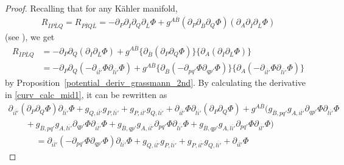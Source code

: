 \documentclass[pdftex]{sigma}
\numberwithin{equation}{section}
\begin{document}
\begin{proof}
Recalling that for any K\"ahler manifold,
\begin{align*}
 R_{\overline{I}P\overline{L}Q}
 =
 R_{P\overline{I}Q\overline{L}}
 =
 -\partial_{P}\partial_{\overline{I}}\partial_{Q}\partial_{\overline{L}}\Phi
 +
 g^{A\overline{B}}
 (
 \partial_{P}\partial_{\overline{B}}\partial_{Q}\Phi
 )
 (
 \partial_{A}\partial_{\overline{I}}\partial_{\overline{L}}\Phi
 )
\end{align*}
(see \cite[Appendix A]{OS_jrnl}),
we get
\begin{align}
 R_{\overline{I}P\overline{L}Q}
& =
 -
 \partial_{P}\partial_{Q}
 (
 \partial_{\overline{I}}\partial_{\overline{L}}\Phi
 )
 +
 g^{A\overline{B}}
 \{
 \partial_{\overline{B}}
 (
 \partial_{P}\partial_{Q}\Phi
 )
 \}
 \{
 \partial_{A}
 (
 \partial_{\overline{I}}\partial_{\overline{L}}\Phi
 )
 \}
 \nonumber
 \\
 &=
 -
 \partial_{P}\partial_{Q}
 (
 -
 \partial_{\overline{il'}}\Phi
 \partial_{\overline{li'}}\Phi
 )
 +
 g^{A\overline{B}}
 \{
 \partial_{\overline{B}}
 (
 -
 \partial_{pq'}\Phi
 \partial_{qp'}\Phi
 )
 \}
 \{
 \partial_{A}
 (
 -
 \partial_{\overline{il'}}\Phi
 \partial_{\overline{li'}}\Phi
 )
 \}
 \label{curv_calc_mid1}
\end{align}
by Proposition~\ref{potential_deriv_grassmann_2nd}.
By calculating the derivative in \eqref{curv_calc_mid1}, it can be rewritten as
\begin{gather}
 \partial_{\overline{il'}}
 (
 \partial_{P}\partial_{Q}\Phi
 )
 \partial_{\overline{li'}}\Phi
 +
 g_{Q,\overline{il'}}
 g_{P,\overline{li'}}
 +
 g_{P,\overline{il'}}
 g_{Q,\overline{li'}}
 +
 \partial_{\overline{il'}}\Phi
 \partial_{\overline{li'}}
 (
 \partial_{P}\partial_{Q}\Phi
 ) +
 g^{A\overline{B}}
 \bigl(
 g_{\overline{B},pq'}
 g_{A,\overline{il'}}
 \partial_{qp'}\Phi
 \partial_{\overline{li'}}\Phi
 \nonumber
 \\
 \qquad
 {}+
 g_{\overline{B},pq'}
 g_{A,\overline{li'}}
 \partial_{qp'}\Phi
 \partial_{\overline{il'}}\Phi
 +
 g_{\overline{B},qp'}
 g_{A,\overline{il'}}
 \partial_{pq'}\Phi
 \partial_{\overline{li'}}\Phi
 +
 g_{\overline{B},qp'}
 g_{A,\overline{li'}}
 \partial_{pq'}\Phi
 \partial_{\overline{il'}}\Phi
 \bigr)
 \nonumber
 \\
 \phantom{\qquad
 +}{}=
 \partial_{\overline{il'}}
 (
 -
 \partial_{pq'}\Phi
 \partial_{qp'}\Phi
 )
 \partial_{\overline{li'}}\Phi
 +
 g_{Q,\overline{il'}}
 g_{P,\overline{li'}}
 +
 g_{P,\overline{il'}}
 g_{Q,\overline{li'}}
 +
 \partial_{\overline{il'}}\Phi

\end{gather}
\end{proof}
\end{document}

